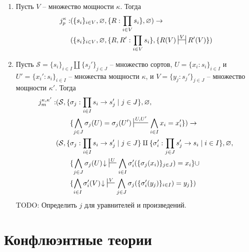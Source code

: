 \documentclass[reqno]{amsart}
\theoremstyle{definition}
\theoremstyle{remark}
\newcommand{\I}{\mathrm{I}}
\begin{document}
\begin{enumerate}
\item Пусть $V$ -- множество мощности $\kappa$. Тогда
\begin{align*}
j_p^\kappa : & (\{ s_i \}_{i \in V}, \varnothing, \{ R : \prod_{i \in V} s_i \}, \varnothing) \to \\
             & (\{ s_i \}_{i \in V}, \varnothing, \{ R, R' : \prod_{i \in V} s_i \}, \{ R(V) \ssststile{}{V} R'(V) \})
\end{align*}
\item Пусть $\mathcal{S} = \{ s_i \}_{i \in I} \amalg \{ s_j' \}_{j \in J}$ -- множество сортов,
$U = \{ x_i : s_i \}_{i \in I}$ и $U' = \{ x_i' : s_i \}_{i \in I}$ -- множества мощности $\kappa$,
и $V = \{ y_j : s_j' \}_{j \in J}$ -- множество мощности $\kappa'$.
Тогда
\begin{align*}
j_m^{\kappa,\kappa'} : & (\mathcal{S}, \{ \sigma_j : \prod_{i \in I} s_i \to s_j' \mid j \in J \}, \varnothing, \\
                       & \qquad \{ \bigwedge_{j \in J} \sigma_j(U) = \sigma_j(U') \sststile{}{U,U'} \bigwedge_{i \in I} x_i = x_i' \}) \to \\
                       & (\mathcal{S}, \{ \sigma_j : \prod_{i \in I} s_i \to s_j' \mid j \in J \} \amalg \{ \sigma_i' : \prod_{j \in J} s_j' \to s_i \mid i \in I \}, \varnothing, \\
                       & \qquad \{ \bigwedge_{j \in J} \sigma_j(U)\!\downarrow\ \sststile{}{U} \bigwedge_{i \in I} \sigma_i'(\{ \sigma_j(x_i) \}_{j \in J}) = x_i \} \cup \\
                       & \qquad \{ \bigwedge_{i \in I} \sigma_i'(V)\!\downarrow\ \sststile{}{V} \bigwedge_{j \in J} \sigma_j(\{ \sigma_i'(y_j) \}_{i \in I}) = y_j \})
\end{align*}
TODO: Определить $j$ для уравнителей и произведений.
\end{enumerate}


\section{Конфлюэнтные теории}
\end{document}
